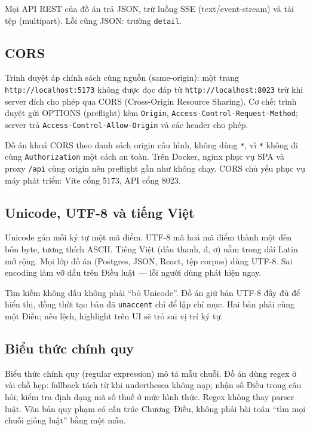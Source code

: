 Mọi API REST của đồ án trả JSON, trừ luồng SSE (text/event-stream) và tải tệp
(multipart). Lỗi cũng JSON: trường \texttt{detail}.

\subsection{CORS}

Trình duyệt áp chính sách cùng nguồn (same-origin): một trang
\texttt{http://localhost:5173} không được đọc đáp từ
\texttt{http://localhost:8023} trừ khi server đích cho phép qua CORS
(Cross-Origin Resource Sharing). Cơ chế: trình duyệt gửi OPTIONS (preflight) kèm
\texttt{Origin}, \texttt{Access-Control-Request-Method}; server trả
\texttt{Access-Control-Allow-Origin} và các header cho phép.

Đồ án khoá CORS theo danh sách origin cấu hình, không dùng \texttt{*}, vì
\texttt{*} không đi cùng \texttt{Authorization} một cách an toàn. Trên Docker,
nginx phục vụ SPA và proxy \texttt{/api} cùng origin nên preflight gần như không
chạy. CORS chủ yếu phục vụ máy phát triển: Vite cổng 5173, API cổng 8023.

\subsection{Unicode, UTF-8 và tiếng Việt}

Unicode gán mỗi ký tự một mã điểm. UTF-8 mã hoá mã điểm thành một đến bốn byte,
tương thích ASCII. Tiếng Việt (dấu thanh, đ, ơ) nằm trong dải Latin mở rộng.
Mọi lớp đồ án (Postgres, JSON, React, tệp corpus) dùng UTF-8. Sai encoding làm
vỡ dấu trên Điều luật --- lỗi người dùng phát hiện ngay.

Tìm kiếm không dấu không phải ``bỏ Unicode''. Đồ án giữ bản UTF-8 đầy đủ để hiển
thị, đồng thời tạo bản đã \texttt{unaccent} chỉ để lập chỉ mục. Hai bản phải cùng
một Điều; nếu lệch, highlight trên UI sẽ trỏ sai vị trí ký tự.

\subsection{Biểu thức chính quy}

Biểu thức chính quy (regular expression) mô tả mẫu chuỗi. Đồ án dùng regex ở
vài chỗ hẹp: fallback tách từ khi underthesea không nạp; nhận số Điều trong câu
hỏi; kiểm tra định dạng mã số thuế ở mức hình thức. Regex không thay parser
luật. Văn bản quy phạm có cấu trúc Chương--Điều, không phải bài toán ``tìm mọi
chuỗi giống luật'' bằng một mẫu.

